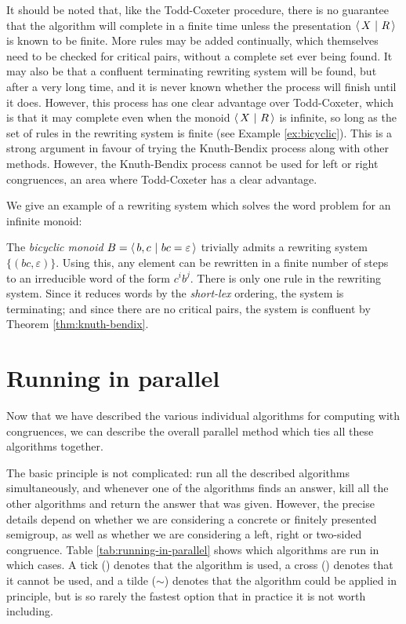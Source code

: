 It should be noted that, like the
Todd-Coxeter procedure, there is no guarantee that the algorithm will complete
in a finite time unless the presentation $\left\langle\,X ~\middle|~ R\,\right\rangle$ is known to be finite.
More rules may be added continually, which themselves need to
be checked for critical pairs, without a complete set ever being found.  It may
also be that a confluent terminating rewriting system will be found, but after a
very long time, and it is never known whether the process will finish until it
does.  However, this process has one clear advantage over Todd-Coxeter, which is
that it may complete even when the monoid $\left\langle\,X ~\middle|~ R\,\right\rangle$ is infinite, so long as
the set of rules in the rewriting system is finite
(see Example \ref{ex:bicyclic}).  This is a strong argument
in favour of trying the Knuth-Bendix process along with other methods.  However,
the Knuth-Bendix process cannot be used for left or right congruences, an area
where Todd-Coxeter has a clear advantage.

We give an example of a rewriting system which solves the word problem for an
infinite monoid:

\begin{example}
  \label{ex:bicyclic}
  The \textit{bicyclic monoid} $B = \left\langle\,b,c ~\middle|~ bc=\varepsilon\,\right\rangle$ trivially admits
  a rewriting system $\{(bc, \varepsilon)\}$.  Using this, any element can be
  rewritten in a finite number of steps to an irreducible word of the form
  $c^ib^j$.  There is only one rule in the rewriting system.  Since it reduces
  words by the \textit{short-lex} ordering, the system is terminating; and since
  there are no critical pairs, the system is confluent by Theorem
  \ref{thm:knuth-bendix}.
\end{example}

\section{Running in parallel}
\label{sec:running-in-parallel}

Now that we have described the various individual algorithms for computing with
congruences, we can describe the overall parallel method which ties all these
algorithms together.

The basic principle is not complicated: run all the described algorithms
simultaneously, and whenever one of the algorithms finds an answer, kill all the
other algorithms and return the answer that was given.  However, the precise
details depend on whether we are considering a concrete or finitely presented
semigroup, as well as whether we are considering a left, right or two-sided
congruence.  Table \ref{tab:running-in-parallel} shows which algorithms are run
in which cases.  A tick (\cmark) denotes that the algorithm is used, a cross
(\xmark) denotes that it cannot be used, and a tilde ($\sim$) denotes that the
algorithm could be applied in principle, but is so rarely the fastest option that in practice
it is not worth including.

